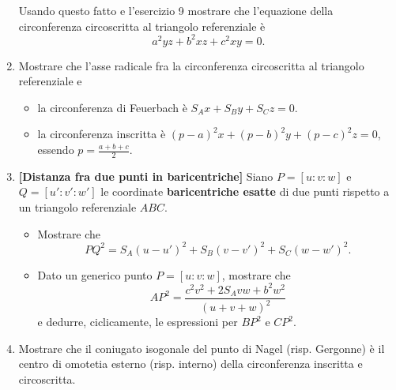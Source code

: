 \begin{enumerate}
	Usando questo fatto e l'esercizio 9 mostrare che l'equazione della circonferenza circoscritta al triangolo referenziale è
	\begin{equation}
	a^2yz+b^2xz+c^2xy=0.
	\end{equation}
	\item Mostrare che l'asse radicale fra la circonferenza circoscritta al triangolo referenziale e 
		\begin{itemize}
			\item la circonferenza di Feuerbach è $S_Ax+S_By+S_Cz=0$.
			\item la circonferenza inscritta è $(p-a)^2x+(p-b)^2y+(p-c)^2z=0$, essendo $p=\displaystyle\frac{a+b+c}{2}$.
		\end{itemize} 
	\item \textbf{[Distanza fra due punti in baricentriche]} Siano $P=[u:v:w]$ e $Q=[u':v':w']$ le coordinate \textbf{baricentriche esatte} di due punti rispetto a un triangolo referenziale $ABC$.
	\begin{itemize} 
	\item Mostrare che
	\begin{equation}
	PQ^2=S_A(u-u')^2+S_B(v-v')^2+S_C(w-w')^2.
	\end{equation}
	\item Dato un generico punto $P=[u:v:w]$, mostrare che 
	\begin{equation}
	AP^2=\frac{c^2v^2+2S_Avw+b^2w^2}{(u+v+w)^2}
	\end{equation}
	e dedurre, ciclicamente, le espressioni per $BP^2$ e $CP^2$.
	\end{itemize}
	\item Mostrare che il coniugato isogonale del punto di Nagel (risp. Gergonne) è il centro di omotetia esterno (risp. interno) della circonferenza inscritta e circoscritta. 
\end{enumerate}
\clearpage

